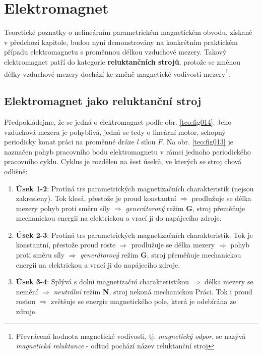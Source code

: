{  \section{Elektromagnet}
    Teoretické poznatky o nelineárním parametrickém magnetickém obvodu, získané v předchozí 
    kapitole, budou nyní demonstrovány na konkrétním praktickém případu elektromagnetu s proměnnou 
    délkou vzduchové mezery. Takový elektromagnet patří do kategorie \textbf{reluktančních strojů}, 
    protože se změnou délky vzduchové mezery dochází ke změně magnetické vodivosti 
    mezery\footnote{Převrácená hodnota magnetické vodivosti, tj.\emph{ magnetický odpor}, se nazývá 
    \emph{magnetická reluktance} - odtud pochází název reluktanční stroj}.

    \subsection{Elektromagnet jako reluktanční stroj}
      Předpokládejme, že se jedná o elektromagnet podle obr. \ref{teo:fig014}. Jeho vzduchová 
      mezera je pohyblivá, jedná se tedy o lineární motor, schopný periodicky konat práci na 
      proměnné dráze \(l\) silou \(F\). Na obr. \ref{teo:fig013} je naznačen pohyb pracovního bodu 
      elektromagnetu v rámci jednoho periodického pracovního cyklu. Cyklus je rozdělen na šest 
      úseků, ve kterých se stroj chová odlišně:
      
      \begin{enumerate}
        \item \textbf{Úsek 1-2}: Protíná trs parametrických magnetizačních charakteristik (nejsou 
          zakresleny). Tok klesá, přestože je proud konstantní \(\Rightarrow\) prodlužuje se délka 
          mezery pohyb proti směru síly \(\Rightarrow\) \emph{generátorový} režim \textbf{G}, stroj 
          přeměňuje mechanickou energii na elektrickou a vrací ji do napájecího zdroje.
        
        \item \textbf{Úsek 2-3}: Protíná trs parametrických magnetizačních charakteristik. Tok je 
          konstantní, přestože proud roste \(\Rightarrow\) prodlužuje se délka mezery 
          \(\Rightarrow\) pohyb proti směru síly \(\Rightarrow\) \emph{generátorový} režim 
          \textbf{G}, stroj přeměňuje mechanickou energii na elektrickou a vrací ji do napájecího 
          zdroje.
   
        \item \textbf{Úsek 3-4}: Splývá s dolní magnetizační charakteristikou \(\Rightarrow\) délka 
          mezery se nemění \(\Rightarrow\) \emph{neutrální} režim \textbf{N}, stroj nekoná 
          mechanickou Práci. Tok i proud rostou \(\Rightarrow\) zvětšuje se energie magnetického 
          pole, která je odebírána ze zdroje. 
        

\end{enumerate}}
